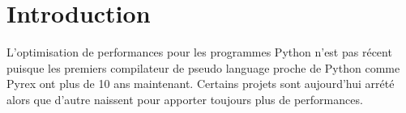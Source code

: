 \documentclass[10pt, onecolumn, preprint]{sigplanconf}
\begin{document}
\section{Introduction}

L'optimisation de performances pour les programmes Python n'est pas récent
puisque les premiers compilateur de pseudo language proche de Python comme Pyrex
ont plus de 10 ans maintenant. Certains projets sont aujourd'hui arrété
alors que d'autre naissent pour apporter toujours plus de performances.

%
%
%
%
\end{document}
